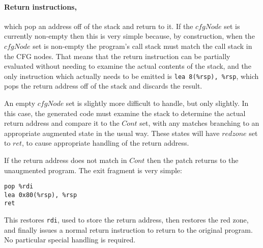 \paragraph{Return instructions,} which pop an address off of the stack
and return to it.  If the $cfgNode$ set is
currently non-empty then this is very simple because, by construction,
when the $cfgNode$ set is non-empty the program's call stack must
match the call stack in the CFG nodes.  That means that the return
instruction can be partially evaluated without needing to examine the
actual contents of the stack, and the only instruction which actually
needs to be emitted is \verb|lea 8(%rsp), %rsp|, which pops the return
address off of the stack and discards the result.  


An empty $cfgNode$ set is slightly more difficult to handle, but only
slightly.  In this case, the generated code must examine the stack to
determine the actual return address and compare it to the $Cont$ set,
with any matches branching to an appropriate augmented state in the
usual way.  These states will have $redzone$ set to $ret$, to cause
appropriate handling of the return address.

If the return address does not match in $Cont$ then the patch returns
to the unaugmented program.  The exit fragment is very simple:

\begin{verbatim}
pop %rdi
lea 0x80(%rsp), %rsp
ret
\end{verbatim}

This restores \verb|rdi|, used to store the return address, then
restores the red zone, and finally issues a normal return instruction
to return to the original program.  No particular special handling is
required.

